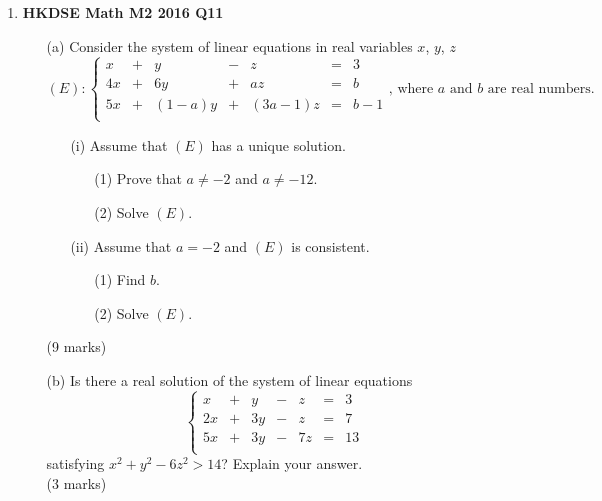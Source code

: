 \documentclass{report}
\begin{document}
\begin{enumerate}
	\item \textbf{HKDSE Math M2 2016 Q11}
	\begin{enumerate}
		\item [(a)]Consider the system of linear equations in real variables $x$, $y$, $z$
		$$(E) : \left\{\begin{matrix}
		x &+&     y&-&      z&=&3  \\
		4x&+&    6y&+&     az&=&b  \\
		5x&+&(1-a)y&+&(3a-1)z&=&b-1\\
		\end{matrix}\right.\text{, where } a\text{ and } b\text{ are real numbers.}$$
		\begin{enumerate}
			\item [(i)]Assume that $(E)$ has a unique solution.
			\begin{enumerate}
				\item [(1)]Prove that $a\neq -2$ and $a \neq -12$.
				\item [(2)]Solve $(E)$. 
			\end{enumerate}
			\item [(ii)]Assume that $a = -2$ and $(E)$ is consistent.
			\begin{enumerate}
				\item [(1)]Find $b$. 
				\item [(2)]Solve $(E)$.
			\end{enumerate}
		\end{enumerate}
		(9 marks)
		\item [(b)] Is there a real solution of the system of linear equations
		$$\left\{\begin{matrix}
		x&+&y&-&z&=&3\\
		2x&+&3y&-&z&=&7\\
		5x&+&3y&-&7z&=&13\\
		\end{matrix}\right.$$
		satisfying $x^2+y^2-6z^2 > 14$? Explain your answer. \\(3 marks)
	\end{enumerate}


\end{enumerate}
\end{document}
